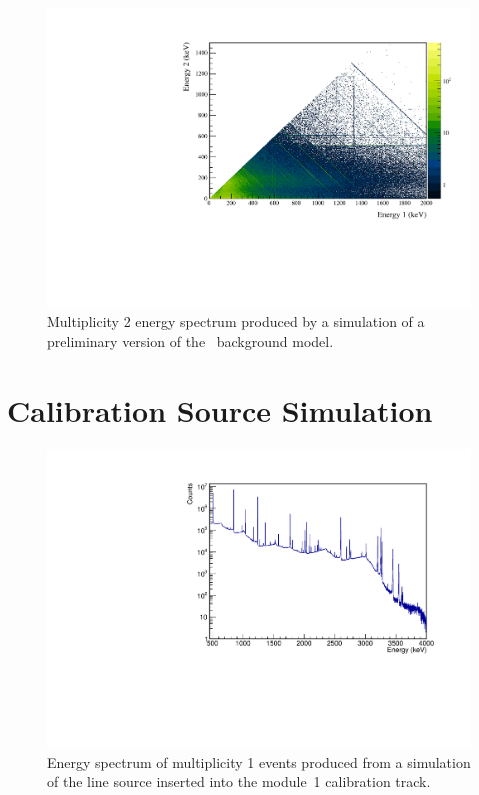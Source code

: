 \documentclass[/main.tex]{subfiles}
\begin{document}
\begin{figure}
  \centering
  \includegraphics[width=.9\linewidth]{BGsim2D}
  \caption[Simulation of multiplicty 2 events from the background model]{
    Multiplicity 2 energy spectrum produced by a simulation of a preliminary version of the \MJD\ background model.
  }
\end{figure}

\section{Calibration Source Simulation}

\begin{figure}
  \centering
  \includegraphics[width=.8\linewidth]{Co56Sim1D}
  \caption[Simulation of multiplicty 1 events from  line source]{
    Energy spectrum of multiplicity 1 events produced from a simulation of the  line source inserted into the module~1 calibration track.
  }
\end{figure}
\end{document}
